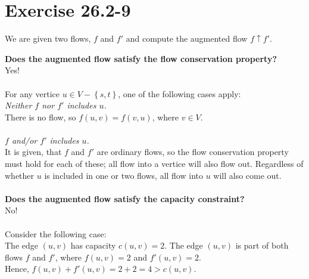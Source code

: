 \section*{Exercise 26.2-9}
We are given two flows, $f$ and $f'$ and compute the augmented flow $f\uparrow f'$.

\textbf{Does the augmented flow satisfy the flow conservation property?}
\\
Yes!
\\
\\
For any vertice $u\in V - \left\{s,t\right\}$, one of the following cases apply:
\\
\textit{Neither $f$ nor $f'$ includes $u$.}
\\
There is no flow, so $f(u,v)=f(v,u)$, where $v\in V$.
\\
\\
\textit{$f$ and/or $f'$ includes $u$.}
\\
It is given, that $f$ and $f'$ are ordinary flows, so the flow conservation property must hold for each of these; all flow into a vertice will also flow out. Regardless of whether $u$ is included in one or two flows, all flow into $u$ will also come out.
\\
\\
\textbf{Does the augmented flow satisfy the capacity constraint?}
\\
No!
\\
\\
Consider the following case:
\\
The edge $(u,v)$ has capacity $c(u,v)=2$. The edge $(u,v)$ is part of both flows $f$ and $f'$, where $f(u,v)=2$ and $f'(u,v)=2$.
\\
Hence, $f(u,v)+f'(u,v)=2+2=4>c(u,v)$.